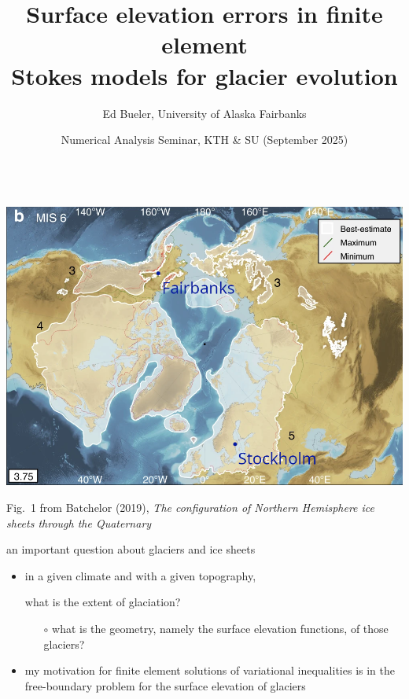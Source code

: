 \documentclass[10pt,svgnames]{beamer}
\title{Surface elevation errors in finite element \\ Stokes models for glacier evolution}
\date{Numerical Analysis Seminar, KTH \& SU (September 2025)}
\author{Ed Bueler, University of Alaska Fairbanks}
\begin{document}
\graphicspath{{figs/}{../../paper/figs/}}

\maketitle


\begin{frame}[plain]

\mbox{\hspace{-9mm} \includegraphics[width=1.15\textwidth]{nhsheets.png}}

\vspace{-2mm}
\hfill {\tiny Fig.~1 from Batchelor (2019), \emph{The configuration of Northern Hemisphere ice sheets through the Quaternary}}
\end{frame}


\begin{frame}{an important question about glaciers and ice sheets}

\begin{itemize}
\item in a given climate and with a given topography,

\begin{center}
\alert{what is the extent of glaciation?}
\end{center}

    \begin{itemize}
    \item[$\circ$] what is the \alert{geometry}, namely the surface elevation functions, of those glaciers?
    \end{itemize}

\bigskip
\item my motivation for \alert{finite element solutions of variational inequalities} is in the free-boundary problem for the surface elevation of glaciers
\end{itemize}
\end{frame}
\end{document}
